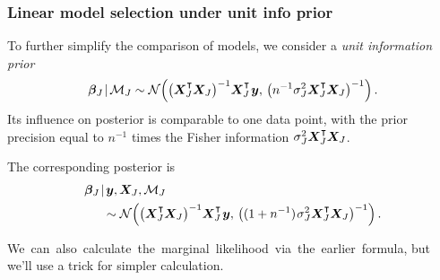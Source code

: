 \documentclass[18pt]{beamer}
\newcommand{\defineTightSpacing}{%
	\setlength{\abovedisplayskip}{.25\baselineskip}%
	\setlength{\belowdisplayskip}{.25\baselineskip}%
}
\newcommand{\given}{\mskip.7\thinmuskip | \mskip.7\thinmuskip}
\newcommand{\transpose}{\text{\raisebox{.5ex}{$\intercal$}}}
\newcommand{\thinnerspace}{\mskip.5\thinmuskip}
\newcommand{\normalDist}{\operatorname{\mathcal{N}}}
\newcommand{\by}{\bm{y}}
\newcommand{\bX}{\bm{X}}
\newcommand{\bbeta}{\bm{\beta}}
\newcommand{\model}{\mathcal{M}}
\newcommand{\nonzeroCoefSet}{J}
\begin{document}
\begin{frame}
\frametitle{Linear model selection under unit info prior}
To further simplify the comparison of models, we consider a \textit{unit information prior}
\begin{equation*} \defineTightSpacing%
\bbeta_\nonzeroCoefSet \given \model_\nonzeroCoefSet 
\sim \normalDist\!\left(
	\left( \bX_\nonzeroCoefSet^\transpose \bX_\nonzeroCoefSet \right)^{-1} \! \bX_\nonzeroCoefSet^\transpose \thinnerspace \by, \,
	\left( n^{-1} \sigma_\nonzeroCoefSet^2 \bX_\nonzeroCoefSet^\transpose \bX_\nonzeroCoefSet \right)^{-1}
\right).
\end{equation*}
Its influence on posterior is comparable to one data point, with the prior precision equal to $n^{-1}$ times the Fisher information $\sigma_\nonzeroCoefSet^2 \bX_\nonzeroCoefSet^\transpose \bX_\nonzeroCoefSet$.

\smallskip
The corresponding posterior is 
\begin{equation*} \defineTightSpacing%
\begin{aligned}
&\bbeta_\nonzeroCoefSet \given \by, \bX_\nonzeroCoefSet, \model_\nonzeroCoefSet \\
&\hspace*{1.5em}\sim \normalDist\!\left(
	\left( \bX_\nonzeroCoefSet^\transpose \bX_\nonzeroCoefSet \right)^{-1} \! \bX_\nonzeroCoefSet^\transpose \thinnerspace \by, \,
	\left( (1 + n^{-1}) \thinnerspace \sigma_\nonzeroCoefSet^2 \bX_\nonzeroCoefSet^\transpose \bX_\nonzeroCoefSet \right)^{-1}
\right).
\end{aligned}
\end{equation*}

\smallskip
\mbox{We can also calculate the marginal likelihood via the earlier formula,} but we'll use a trick for simpler calculation.
\end{frame}
\end{document}
